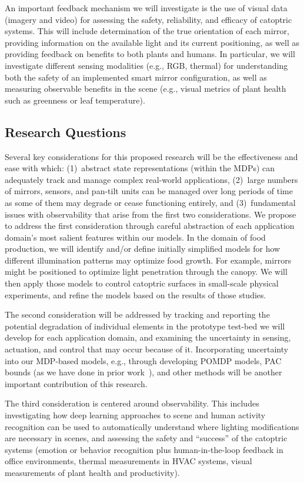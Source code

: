 An important feedback mechanism we will investigate is the use of visual
data (imagery and video) for assessing the safety, reliability, and
efficacy of catoptric systems. This will include determination of the true
orientation of each mirror, providing information on the available
light and its current positioning, as well as providing feedback on
benefits to both plants and humans.
In particular, we will investigate different sensing modalities (e.g., RGB,
thermal) for understanding both the safety of an implemented smart mirror
configuration, as well as measuring observable benefits in the scene (e.g.,
visual metrics of plant health such as greenness or leaf temperature).

\subsection{Research Questions}
\label{sec:rq}


Several key considerations for this proposed research will be the effectiveness
and ease with which: (1)~abstract state representations (within the MDPs) can
adequately track and manage complex real-world applications, (2)~large numbers
of mirrors, sensors, and pan-tilt units can be managed over long periods of
time as some of them may degrade or cease functioning entirely, and
(3)~fundamental issues with observability that arise from the first two
considerations.  We propose to address the first consideration through careful
abstraction of each application domain's most salient features within our
models.  In the domain of food production, we will 
identify and/or define initially simplified
models for how different illumination patterns may optimize food growth.
For example, mirrors might be positioned to optimize light penetration
through the canopy.
We will then apply those models to control catoptric surfaces in small-scale
physical experiments, and refine the models based on the results of those
studies.

The second consideration will be addressed by tracking and reporting
the potential degradation of individual elements in the prototype test-bed we
will develop for each application domain, and examining the uncertainty in
sensing, actuation, and control that may occur because of it.  Incorporating
uncertainty into our MDP-based models, e.g., through developing POMDP models,
PAC bounds (as we have done in prior work~\cite{gtgs10}),
and other methods will be another important contribution of this
research.

The third consideration is centered around observability. 
This includes investigating how deep learning approaches to scene and
human activity recognition can be used to automatically understand where
lighting modifications are necessary in scenes, and 
assessing the safety and ``success'' of the catoptric systems
(emotion or behavior recognition plus human-in-the-loop feedback
in office environments, thermal measurements in HVAC systems,
visual measurements of plant health and productivity).

